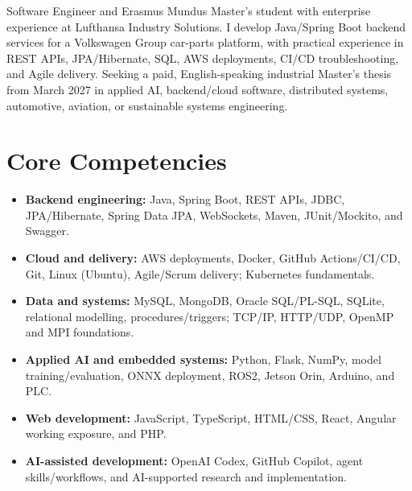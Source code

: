 \documentclass[11pt,a4paper,sans]{moderncv}
\begin{document}
\makecvtitle

\vspace{-8pt}
\small{Software Engineer and Erasmus Mundus Master's student with enterprise experience at Lufthansa Industry Solutions. I develop Java/Spring Boot backend services for a Volkswagen Group car-parts platform, with practical experience in REST APIs, JPA/Hibernate, SQL, AWS deployments, CI/CD troubleshooting, and Agile delivery. Seeking a paid, English-speaking industrial Master's thesis from March 2027 in applied AI, backend/cloud software, distributed systems, automotive, aviation, or sustainable systems engineering.}

\section{Core Competencies}
\vspace{1pt}
\begin{itemize}
  \item \textbf{Backend engineering:} Java, Spring Boot, REST APIs, JDBC, JPA/Hibernate, Spring Data JPA, WebSockets, Maven, JUnit/Mockito, and Swagger.
  \item \textbf{Cloud and delivery:} AWS deployments, Docker, GitHub Actions/CI/CD, Git, Linux (Ubuntu), Agile/Scrum delivery; Kubernetes fundamentals.
  \item \textbf{Data and systems:} MySQL, MongoDB, Oracle SQL/PL-SQL, SQLite, relational modelling, procedures/triggers; TCP/IP, HTTP/UDP, OpenMP and MPI foundations.
  \item \textbf{Applied AI and embedded systems:} Python, Flask, NumPy, model training/evaluation, ONNX deployment, ROS2, Jetson Orin, Arduino, and PLC.
  \item \textbf{Web development:} JavaScript, TypeScript, HTML/CSS, React, Angular working exposure, and PHP.
  \item \textbf{AI-assisted development:} OpenAI Codex, GitHub Copilot, agent skills/workflows, and AI-supported research and implementation.
\end{itemize}
\end{document}
